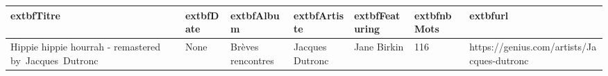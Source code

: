 \begin{table}[] 
\begin{tabular}{|l|l|l|l|l|l|l|} 
\hline 
	extbf{Titre} & 	extbf{Date} & 	extbf{Album} & 	extbf{Artiste} & 	extbf{Featuring} & 	extbf{nbMots} & 	extbf{url} \\ \hline 
Hippie hippie hourrah - remastered by Jacques Dutronc         & None         & Brèves rencontres    & Jacques Dutronc          & Jane Birkin               & 116          & https://genius.com/artists/Jacques-dutronc          \\ \hline 
\end{tabular} 
\end{table} 
